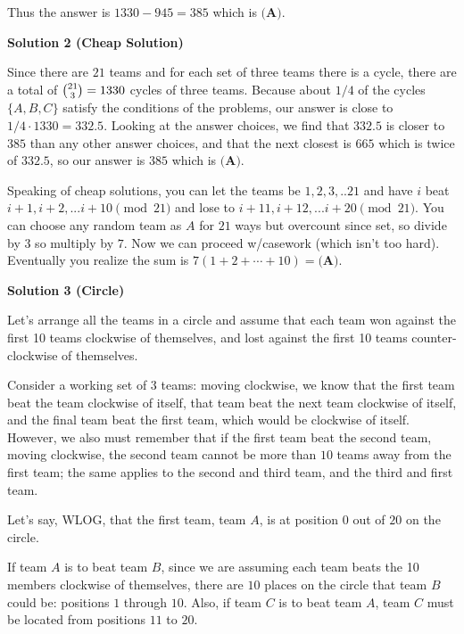 \begin{enumerate}
 Thus the answer is $1330-945=385$ which is $\boxed{\textbf{(A)}}$.

 



\textbf{Solution 2 (Cheap Solution)}

Since there are $21$ teams and for each set of three teams there is a cycle, there are a total of $\tbinom{21}3=1330$ cycles of three teams.  Because about $1/4$ of the cycles $\{A, B, C\}$ satisfy the conditions of the problems, our answer is close to $1/4 \cdot 1330=332.5$. Looking at the answer choices, we find that $332.5$ is closer to $385$ than any other answer choices, and that the next closest is $665$ which is twice of $332.5$, so our answer is $385$ which is $\boxed{\textbf{(A)}}$.

 
Speaking of cheap solutions, you can let the teams be $1,2,3,..21$ and have $i$ beat $i+1,i+2, ... i+10 \pmod{21}$ and lose to $i+11,i+12, ... i+20 \pmod{21}.$ You can choose any random team as $A$ for $21$ ways but overcount since set, so divide by $3$ so multiply by $7.$ Now we can proceed w/casework (which isn't too hard). Eventually you realize the sum is $7(1+2+\cdots+10) = \boxed{\textbf{(A)}}$.

 



\textbf{Solution 3 (Circle)}

Let's arrange all the teams in a circle and assume that each team won against the first 10 teams clockwise of themselves, and lost against the first 10 teams counter-clockwise of themselves.

 Consider a working set of $3$ teams: moving clockwise, we know that the first team beat the team clockwise of itself, that team beat the next team clockwise of itself, and the final team beat the first team, which would be clockwise of itself. However, we also must remember that if the first team beat the second team, moving clockwise, the second team cannot be more than $10$ teams away from the first team; the same applies to the second and third team, and the third and first team.

 Let's say, WLOG, that the first team, team $A$, is at position $0$ out of $20$ on the circle.

 If team $A$ is to beat team $B$, since we are assuming each team beats the 10 members clockwise of themselves, there are $10$ places on the circle that team $B$ could be: positions $1$ through $10$. Also, if team $C$ is to beat team $A$, team $C$ must be located from positions $11$ to $20$.


\end{enumerate}
